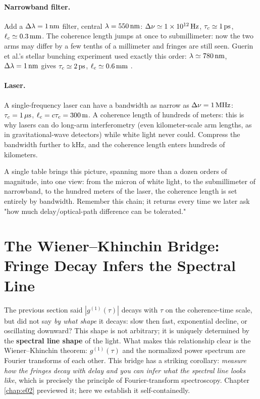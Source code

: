 \paragraph{Narrowband filter.} Add a \(\Delta\lambda=1\,{\rm nm}\) filter, central \(\lambda=550\,{\rm nm}\): \(\Delta\nu\simeq1\times10^{12}\,{\rm Hz}\), \(\tau_c\simeq1\,{\rm ps}\), \(\ell_c\simeq0.3\,{\rm mm}\). The coherence length jumps at once to submillimeter: now the two arms may differ by a few tenths of a millimeter and fringes are still seen. Guerin et al.'s stellar bunching experiment used exactly this order: \(\lambda\simeq780\,{\rm nm}\), \(\Delta\lambda=1\,{\rm nm}\) gives \(\tau_c\simeq2\,{\rm ps}\), \(\ell_c\simeq0.6\,{\rm mm}\) \citep{2017MNRAS.472.4126G}.

\paragraph{Laser.} A single-frequency laser can have a bandwidth as narrow as \(\Delta\nu=1\,{\rm MHz}\): \(\tau_c=1\,\mu{\rm s}\), \(\ell_c=c\tau_c=300\,{\rm m}\). A coherence length of hundreds of meters: this is why lasers can do long-arm interferometry (even kilometer-scale arm lengths, as in gravitational-wave detectors) while white light never could. Compress the bandwidth further to kHz, and the coherence length enters hundreds of kilometers.

A single table brings this picture, spanning more than a dozen orders of magnitude, into one view: from the micron of white light, to the submillimeter of narrowband, to the hundred meters of the laser, the coherence length is set entirely by bandwidth. Remember this chain; it returns every time we later ask "how much delay/optical-path difference can be tolerated."

\section{The Wiener--Khinchin Bridge: Fringe Decay Infers the Spectral Line}
\label{sec:e09-wiener-khinchin}

The previous section said \(|g^{(1)}(\tau)|\) decays with \(\tau\) on the coherence-time scale, but did not say \emph{by what shape} it decays: slow then fast, exponential decline, or oscillating downward? This shape is not arbitrary; it is uniquely determined by the \textbf{spectral line shape} of the light. What makes this relationship clear is the Wiener--Khinchin theorem: \(g^{(1)}(\tau)\) and the normalized power spectrum are Fourier transforms of each other. This bridge has a striking corollary: \emph{measure how the fringes decay with delay and you can infer what the spectral line looks like}, which is precisely the principle of Fourier-transform spectroscopy. Chapter \ref{chap:e02} previewed it; here we establish it self-containedly.

